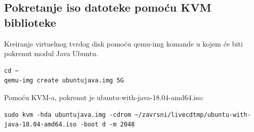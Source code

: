 \documentclass[12pt,vi]{mitthesis}
\begin{document}
\subsection*{Pokretanje iso datoteke pomoću KVM biblioteke}
\indent
Kreiranje virtuelnog tvrdog disk pomoću qemu-img komande u kojem će biti pokrenut modul Java Ubuntu.
\begin{lstlisting}[style=BashInputStyle]
cd ~
qemu-img create ubuntujava.img 5G
\end{lstlisting}

\noindent 
Pomoću KVM-a, pokrenut je ubuntu-with-java-18.04-amd64.iso:
\begin{lstlisting}[style=BashInputStyle]
sudo kvm -hda ubuntujava.img -cdrom ~/zavrsni/livecdtmp/ubuntu-with-java-18.04-amd64.iso -boot d -m 2048
\end{lstlisting}
\end{document}
